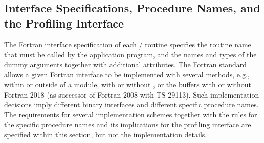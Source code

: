 \subsection{Interface Specifications, Procedure Names, and the Profiling Interface}
\label{sec:f90:linker-names}

The Fortran interface specification of each \MPI/ routine
specifies the routine name that must be called by the application program,
and the names and types of the dummy arguments together with
additional attributes.
The Fortran standard allows
a given Fortran interface to be implemented
with several methods, e.g., within or outside of a module,
with or without , or the buffers with or without
Fortran 2018 (as successor of Fortran 2008 with TS 29113).
Such implementation decisions imply different binary interfaces
and different specific procedure names.
The requirements for
several implementation schemes together with the
rules for the specific procedure names and
its implications for the profiling interface are specified
within this section, but not the implementation details.

